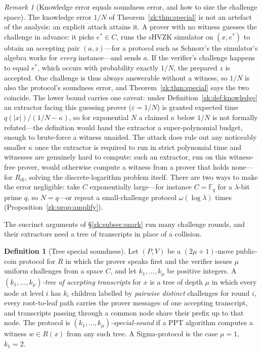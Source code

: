 \documentclass[11pt,a4paper]{article}
\theoremstyle{definition}
\newtheorem{definition}[theorem]{Definition}
\theoremstyle{remark}
\newtheorem{remark}[theorem]{Remark}
\newcommand{\Fq}{\ensuremath{\mathbb{F}_{q}}}
\providecommand{\abs}[1]{\lvert #1 \rvert}
\begin{document}
\begin{remark}[Knowledge error equals soundness error, and how to
size the challenge space]\label{zk:rem:challengesize}
The knowledge error \(1/N\) of Theorem~\ref{zk:thm:special} is not an
artefact of the analysis: an explicit attack attains it. A prover with no
witness guesses the challenge in advance: it picks \(e^{*} \in C\),
runs the sHVZK simulator on \((x, e^{*})\) to obtain an accepting
pair \((a, z)\)---for a protocol such as Schnorr's the simulator's
algebra works for \emph{every} instance---and sends \(a\). If the
verifier's challenge happens to equal \(e^{*}\), which occurs with
probability exactly \(1/N\), the prepared \(z\) is accepted. One
challenge is thus always answerable without a witness, so \(1/N\) is
also the protocol's soundness error, and
Theorem~\ref{zk:thm:special} says the two coincide. The lower bound
carries one caveat: under
Definition~\ref{zk:def:knowledge} an extractor facing this guessing
prover (\(\varepsilon = 1/N\)) is granted expected time
\(q(\abs{x})/(1/N - \kappa)\), so for exponential \(N\) a claimed
\(\kappa\) below \(1/N\) is not formally refuted---the definition
would hand the extractor a super-polynomial budget, enough to
brute-force a witness unaided. The attack does rule out any
noticeably smaller \(\kappa\) once the extractor is required to run
in strict polynomial time and witnesses are genuinely hard to
compute: such an extractor, run on this witness-free prover, would
otherwise compute a witness from a prover that holds none---for
\(R_{\mathrm{dl}}\), solving the discrete-logarithm problem itself.
There are two ways to make the error negligible: take \(C\) exponentially
large---for instance \(C = \Fq\) for a \(\lambda\)-bit prime \(q\),
so \(N = q\)---or repeat a small-challenge protocol
\(\omega(\log \lambda)\) times
(Proposition~\ref{zk:prop:amplify}).
\end{remark}

The succinct arguments of \S\ref{zk:subsec:snark} run many challenge
rounds, and their extractors need a tree of transcripts in place of a
collision.

\begin{definition}[Tree special soundness]\label{zk:def:treess}
Let \((P, V)\) be a \((2\mu + 1)\)-move public-coin protocol for
\(R\) in which the prover speaks first and the verifier issues
\(\mu\) uniform challenges from a space \(C\), and let
\(k_1, \dots, k_\mu\) be positive integers. A
\emph{\((k_1, \dots, k_\mu)\)-tree of accepting transcripts} for
\(x\) is a tree of depth \(\mu\) in which every node at level \(i\)
has \(k_i\) children labelled by \emph{pairwise distinct} challenges
for round \(i\), every root-to-leaf path carries the prover messages
of one accepting transcript, and transcripts passing through a
common node share their prefix up to that node. The protocol is
\emph{\((k_1, \dots, k_\mu)\)-special-sound} if a PPT algorithm
computes a witness \(w \in R(x)\) from any such tree. A
Sigma-protocol is the case \(\mu = 1\), \(k_1 = 2\).
\end{definition}
\end{document}
